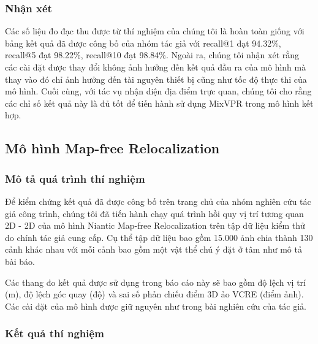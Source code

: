 \subsubsection*{Nhận xét}

Các số liệu đo đạc thu được từ thí nghiệm của chúng tôi là hoàn toàn giống với bảng kết quả đã được công bố của nhóm tác giả với recall@1 đạt 94.32\%, recall@5 đạt 98.22\%, recall@10 đạt 98.84\%. Ngoài ra, chúng tôi nhận xét rằng các cài đặt được thay đổi không ảnh hưởng đến kết quả đầu ra của mô hình mà thay vào đó chỉ ảnh hưởng đến tài nguyên thiết bị cũng như tốc độ thực thi của mô hình. Cuối cùng, với tác vụ nhận diện địa điểm trực quan, chúng tôi cho rằng các chỉ số kết quả này là đủ tốt để tiến hành sử dụng MixVPR trong mô hình kết hợp.

\subsection{Mô hình Map-free Relocalization}
\subsubsection*{Mô tả quá trình thí nghiệm}

Để kiểm chứng kết quả đã được công bố trên trang chủ của nhóm nghiên cứu tác giả công trình, chúng tôi đã tiến hành chạy quá trình hồi quy vị trí tương quan 2D - 2D của mô hình Niantic Map-free Relocalization trên tập dữ liệu kiểm thử do chính tác giả cung cấp. Cụ thể tập dữ liệu bao gồm 15.000 ảnh chia thành 130 cảnh khác nhau với mỗi cảnh bao gồm một vật thể chú ý đặt ở tâm như mô tả bài báo.

Các thang đo kết quả được sử dụng trong báo cáo này sẽ bao gồm độ lệch vị trí (m), độ lệch góc quay (độ) và sai số phản chiếu điểm 3D ảo VCRE (điểm ảnh). Các cài đặt của mô hình được giữ nguyên như trong bài nghiên cứu của tác giả.

\subsubsection*{Kết quả thí nghiệm}

